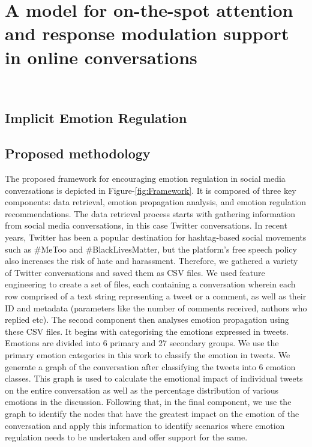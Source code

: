 \section{A model for on-the-spot attention and response modulation support in online conversations}~\label{sec:design}
\subsection{Implicit Emotion Regulation}
\subsection{Proposed methodology}
The proposed framework for encouraging emotion regulation in social media conversations is depicted in Figure-\ref{fig:Framework}. It is composed of three key components: data retrieval, emotion propagation analysis, and emotion regulation recommendations. The data retrieval process starts with gathering information from social media conversations, in this case Twitter conversations. In recent years, Twitter has been a popular destination for hashtag-based social movements such as \#MeToo and \#BlackLivesMatter, but the platform's free speech policy also increases the risk of hate and harassment. Therefore, we gathered a variety of Twitter conversations and saved them as CSV files. We used feature engineering to create a set of files, each containing a conversation wherein each row comprised of a text string representing a tweet or a comment, as well as their ID and metadata (parameters like the number of comments received, authors who replied etc). The second component then analyses emotion propagation using these CSV files. It begins with categorising the emotions expressed in tweets. Emotions are divided into 6 primary and 27 secondary groups. We use the primary emotion categories in this work to classify the emotion in tweets. We generate a graph of the conversation after classifying the tweets into 6 emotion classes. This graph is used to calculate the emotional impact of individual tweets on the entire conversation as well as the percentage distribution of various emotions in the discussion. Following that, in the final component, we use the graph to identify the nodes that have the greatest impact on the emotion of the conversation and apply this information to identify scenarios where emotion regulation needs to be undertaken and offer support for the same.
